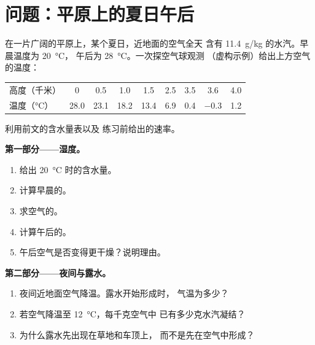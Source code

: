 \section{问题：平原上的夏日午后}

\begin{problem}
\label{pb:g10:why-clouds-form:1}
在一片广阔的平原上，某个夏日，近地面的空气全天
含有 \qty{11.4}{g/kg} 的水汽。早晨温度为 \qty{20}{\degreeCelsius}，
午后为 \qty{28}{\degreeCelsius}。一次探空气球观测
（虚构示例）给出上方空气的温度：

\begin{center}
\small
\begin{tabular}{l*{8}{c}}
\hline
高度（千米） & 0 & 0.5 & 1.0 & 1.5 & 2.5 & 3.5 & 3.6 & 4.0 \\
温度（\unit{\degreeCelsius}） & 28.0 & 23.1 & 18.2 & 13.4 & 6.9 & 0.4 & $-0.3$ & 1.2 \\
\hline
\end{tabular}
\end{center}

\noindent 利用前文的含水量表以及
练习前给出的速率。

\medskip
\noindent\textbf{第一部分——湿度。}
\begin{enumerate}
  \item 给出 \qty{20}{\degreeCelsius} 时的含水量。
  \item 计算早晨的。
  \item 求空气的。
  \item 计算午后的。
  \item 午后空气是否变得更干燥？说明理由。
\end{enumerate}

\medskip
\noindent\textbf{第二部分——夜间与露水。}
\begin{enumerate}[resume]
  \item 夜间近地面空气降温。露水开始形成时，
        气温为多少？
  \item 若空气降温至 \qty{12}{\degreeCelsius}，每千克空气中
        已有多少克水汽凝结？
  \item 为什么露水先出现在草地和车顶上，
        而不是先在空气中形成？
\end{enumerate}


\end{problem}
